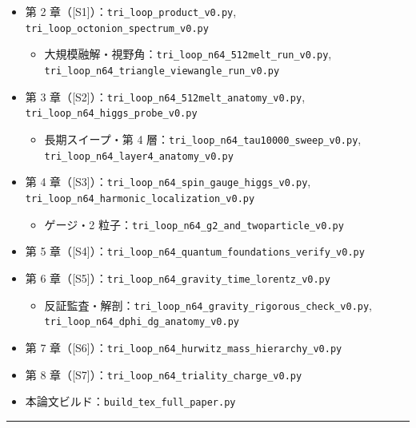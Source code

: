 \documentclass[
  a4paper,
]{ltjsarticle}
\providecommand{\tightlist}{%
  \setlength{\itemsep}{0pt}\setlength{\parskip}{0pt}}
\begin{document}
\begin{itemize}
\tightlist
\item
  第 2 章（{[}S1{]}）：\texttt{tri\_loop\_product\_v0.py},
  \texttt{tri\_loop\_octonion\_spectrum\_v0.py}

  \begin{itemize}
  \tightlist
  \item
    大規模融解・視野角：\texttt{tri\_loop\_n64\_512melt\_run\_v0.py},
    \texttt{tri\_loop\_n64\_triangle\_viewangle\_run\_v0.py}
  \end{itemize}
\item
  第 3 章（{[}S2{]}）：\texttt{tri\_loop\_n64\_512melt\_anatomy\_v0.py},
  \texttt{tri\_loop\_n64\_higgs\_probe\_v0.py}

  \begin{itemize}
  \tightlist
  \item
    長期スイープ・第 4
    層：\texttt{tri\_loop\_n64\_tau10000\_sweep\_v0.py},
    \texttt{tri\_loop\_n64\_layer4\_anatomy\_v0.py}
  \end{itemize}
\item
  第 4
  章（{[}S3{]}）：\texttt{tri\_loop\_n64\_spin\_gauge\_higgs\_v0.py},
  \texttt{tri\_loop\_n64\_harmonic\_localization\_v0.py}

  \begin{itemize}
  \tightlist
  \item
    ゲージ・2 粒子：\texttt{tri\_loop\_n64\_g2\_and\_twoparticle\_v0.py}
  \end{itemize}
\item
  第 5
  章（{[}S4{]}）：\texttt{tri\_loop\_n64\_quantum\_foundations\_verify\_v0.py}
\item
  第 6
  章（{[}S5{]}）：\texttt{tri\_loop\_n64\_gravity\_time\_lorentz\_v0.py}

  \begin{itemize}
  \tightlist
  \item
    反証監査・解剖：\texttt{tri\_loop\_n64\_gravity\_rigorous\_check\_v0.py},
    \texttt{tri\_loop\_n64\_dphi\_dg\_anatomy\_v0.py}
  \end{itemize}
\item
  第 7
  章（{[}S6{]}）：\texttt{tri\_loop\_n64\_hurwitz\_mass\_hierarchy\_v0.py}
\item
  第 8 章（{[}S7{]}）：\texttt{tri\_loop\_n64\_triality\_charge\_v0.py}
\item
  本論文ビルド：\texttt{build\_tex\_full\_paper.py}
\end{itemize}

\begin{center}\rule{0.5\linewidth}{0.5pt}\end{center}
\end{document}
